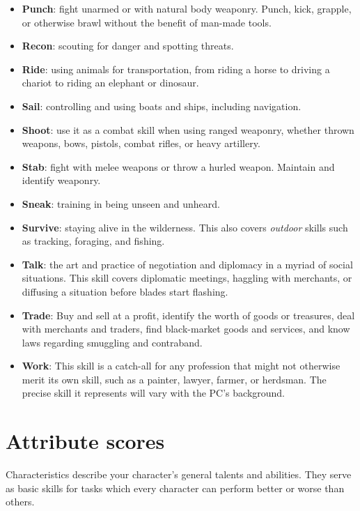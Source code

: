 \documentclass[itdr/core]{subfiles}
\begin{document}
\begin{itemize}
\item \textbf{Punch}: fight unarmed or with natural body weaponry. Punch, kick, grapple, or otherwise brawl without the benefit of man-made tools.

\item \textbf{Recon}: scouting for danger and spotting threats.

\item \textbf{Ride}:  using animals for transportation, from riding a horse to driving a chariot to riding an elephant or dinosaur.

\item \textbf{Sail}:  controlling and using boats and ships, including navigation.

\item \textbf{Shoot}: use it as a combat skill when using ranged weaponry, whether thrown weapons, bows, pistols, combat rifles, or heavy artillery.

\item \textbf{Stab}:  fight with melee weapons or throw a hurled weapon. Maintain and identify weaponry.

\item \textbf{Sneak}: training in being unseen and unheard.

\item \textbf{Survive}: staying alive in the wilderness. This also covers \emph{outdoor} skills such as tracking, foraging, and fishing.

\item \textbf{Talk}: the art and practice of negotiation and diplomacy in a myriad of social situations. This skill covers diplomatic meetings, haggling with merchants, or diffusing a situation before blades start flashing.

\item \textbf{Trade}:   Buy and sell at a profit, identify the worth of goods or treasures, deal with merchants and traders, find black-market goods and services, and know laws regarding smuggling and contraband.

\item \textbf{Work}: This skill is a catch-all for any profession that might not otherwise merit its own skill, such as a painter, lawyer, farmer, or herdsman. The precise skill it represents will vary with the PC’s background.
\end{itemize}

\section{Attribute scores}
Characteristics describe your character's general talents and abilities. They serve as basic skills for tasks which every character can perform better or worse than others.
\end{document}

